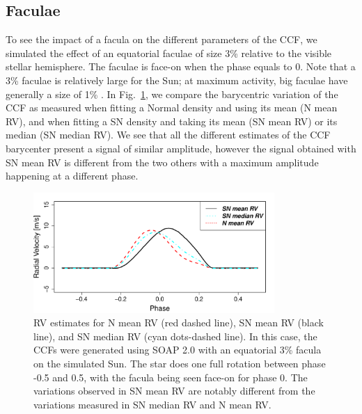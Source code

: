\documentclass{aa}
\newcommand{\jessi}[1]{{\color{Purple}[[\textbf{Jessi: }#1]]}}
\begin{document}
\subsection{Faculae} \label{sec:soap.faculae}

To see the impact of a facula on the different parameters of the CCF, we simulated the effect of an equatorial faculae
of size 3\% relative to the visible stellar hemisphere. The faculae is face-on when the phase equals to 0. Note that a 3\% faculae is relatively large for the Sun; at maximum activity, big faculae have generally a size of 1\% \citep[e.g.][]{Borgniet-2015}. In Fig.~\ref{fig:faculae}, we compare the barycentric variation of the CCF as measured when fitting a Normal density and using its mean (N mean RV), and when fitting a SN density and taking its mean (SN mean RV) or its median (SN median RV). We see that all the different estimates of the CCF barycenter present a signal of similar amplitude, however the signal obtained with SN mean RV is different from the two others with a maximum amplitude happening at a different phase.

\begin{figure}[htbp]
\begin{center}
\includegraphics[width=3.6in]{RV_comparison_FACULAE.pdf} 
\caption{RV estimates for N mean RV (red dashed line),  SN mean RV (black line), and SN median RV (cyan dots-dashed line). In this case, the CCFs were generated using SOAP 2.0 with an equatorial 3\% facula on the simulated Sun. The star does one full rotation between phase -0.5 and 0.5, with the facula being seen face-on for phase $0$. The variations observed in SN mean RV are notably different from the variations measured in SN median RV and N mean RV.  
}
    \label{fig:faculae}
\end{center}
\end{figure}
\end{document}
